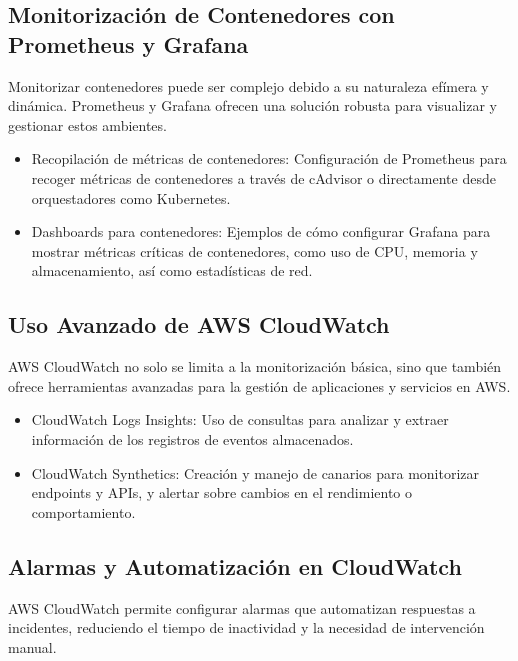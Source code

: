 {        \subsection{Monitorización de Contenedores con Prometheus y Grafana}
            Monitorizar contenedores puede ser complejo debido a su naturaleza efímera y dinámica. Prometheus y Grafana ofrecen una solución robusta para visualizar y gestionar estos ambientes.
            
            \begin{itemize}
                \item Recopilación de métricas de contenedores: Configuración de Prometheus para recoger métricas de contenedores a través de cAdvisor o directamente desde orquestadores como Kubernetes.
                \item Dashboards para contenedores: Ejemplos de cómo configurar Grafana para mostrar métricas críticas de contenedores, como uso de CPU, memoria y almacenamiento, así como estadísticas de red.
            \end{itemize}
        
        \subsection{Uso Avanzado de AWS CloudWatch}
            AWS CloudWatch no solo se limita a la monitorización básica, sino que también ofrece herramientas avanzadas para la gestión de aplicaciones y servicios en AWS.
        
            \begin{itemize}
                \item CloudWatch Logs Insights: Uso de consultas para analizar y extraer información de los registros de eventos almacenados.
                \item CloudWatch Synthetics: Creación y manejo de canarios para monitorizar endpoints y APIs, y alertar sobre cambios en el rendimiento o comportamiento.
            \end{itemize}
            
        \subsection{Alarmas y Automatización en CloudWatch}
            AWS CloudWatch permite configurar alarmas que automatizan respuestas a incidentes, reduciendo el tiempo de inactividad y la necesidad de intervención manual.
            
}
